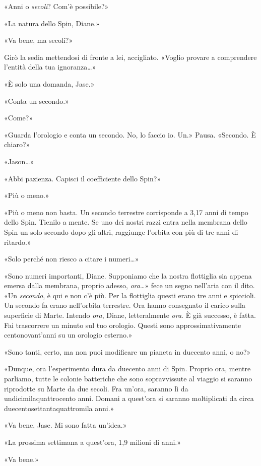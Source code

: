 «Anni o \emph{secoli}? Com'è possibile?»

«La natura dello Spin, Diane.»

«Va bene, ma secoli?»

Girò la sedia mettendosi di fronte a lei, accigliato. «Voglio provare a
comprendere l'entità della tua ignoranza\ldots»

«È solo una domanda, Jase.»

«Conta un secondo.»

«Come?»

«Guarda l'orologio e conta un secondo. No, lo faccio io. Un.» Pausa.
«Secondo. È chiaro?»

«Jason\ldots»

«Abbi pazienza. Capisci il coefficiente dello Spin?»

«Più o meno.»

«Più o meno non basta. Un secondo terrestre corrisponde a 3,17 anni di
tempo dello Spin. Tienilo a mente. Se uno dei nostri razzi entra nella
membrana dello Spin un solo secondo dopo gli altri, raggiunge l'orbita
con più di tre anni di ritardo.»

«Solo perché non riesco a citare i numeri\ldots»

«Sono numeri importanti, Diane. Supponiamo che la nostra flottiglia sia
appena emersa dalla membrana, proprio adesso, \emph{ora}\ldots» fece un
segno nell'aria con il dito. «Un \emph{secondo}, è qui e non c'è più.
Per la flottiglia questi erano tre anni e spiccioli. Un secondo fa erano
nell'orbita terrestre. Ora hanno consegnato il carico sulla superficie
di Marte. Intendo \emph{ora}, Diane, letteralmente \emph{ora}. È già
successo, è fatta. Fai trascorrere un minuto sul tuo orologio. Questi
sono approssimativamente centonovant'anni su un orologio esterno.»

«Sono tanti, certo, ma non puoi modificare un pianeta in duecento anni,
o no?»

«Dunque, ora l'esperimento dura da duecento anni di Spin. Proprio ora,
mentre parliamo, tutte le colonie batteriche che sono sopravvissute al
viaggio si saranno riprodotte su Marte da due secoli. Fra un'ora,
saranno lì da undicimilaquattrocento anni. Domani a quest'ora si saranno
moltiplicati da circa duecentosettantaquattromila anni.»

«Va bene, Jase. Mi sono fatta un'idea.»

«La prossima settimana a quest'ora, 1,9 milioni di anni.»

«Va bene.»

